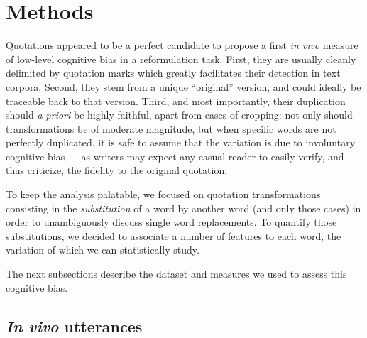\section{Methods} %
\label{sec:protocol}

Quotations appeared to be a perfect candidate to propose a first \emph{in vivo} measure of low-level cognitive bias in a reformulation task. %
First, they are usually cleanly delimited by quotation marks %
which greatly facilitates their detection in text corpora.
Second, they stem from a unique ``original'' version, and could ideally be traceable back to that version.
Third, and most importantly, their duplication should \emph{a priori} be highly faithful, apart from cases of cropping: not only should transformations be of moderate magnitude, but when specific words are not perfectly duplicated, it is safe to assume that the variation is due to involuntary cognitive bias --- as writers may expect any casual reader to easily verify, and thus criticize, the fidelity to the original quotation.


 To keep the analysis palatable, we focused on quotation transformations consisting in the \emph{substitution} of a word by another word (and only those cases) in order to unambiguously discuss single word replacements.
To quantify those substitutions, we decided to associate a number of features to each word, the variation of which we can statistically study.

The next subsections describe the dataset and measures we used to assess this cognitive bias.

\subsection{\emph{In vivo} utterances}

